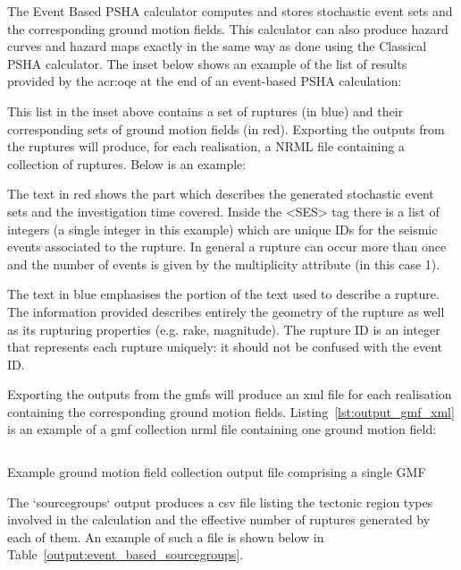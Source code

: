 The Event Based PSHA calculator computes and stores stochastic event sets and
the corresponding ground motion fields. This calculator can also produce
hazard curves and hazard maps exactly in the same way as done using the
Classical PSHA calculator. The inset below shows an example of the list of
results provided by the \gls{acr:oqe} at the end of an event-based PSHA
calculation:



This list in the inset above contains a set of ruptures (in blue) and their
corresponding sets of ground motion fields (in red). Exporting the outputs
from the ruptures will produce, for each realisation, a NRML file containing a
collection of ruptures. Below is an example:



The text in red shows the part which describes the generated
stochastic event sets and the investigation time covered. Inside the
<SES> tag there is a list of integers (a single integer in this example)
which are unique IDs for the seismic events associated to the rupture.
In general a rupture can occur more than once and the number of events
is given by the multiplicity attribute (in this case 1).

The text in blue emphasises the portion of the text used to describe a
rupture. The information provided describes entirely the geometry of the
rupture as well as its rupturing properties (e.g. rake, magnitude). The
rupture ID is an integer that represents each rupture uniquely: it should
not be confused with the event ID.

Exporting the outputs from the gmfs will produce an xml file for each
realisation containing the corresponding ground motion fields.
Listing~\ref{lst:output_gmf_xml} is an example of a gmf collection
nrml file containing one ground motion field:

\begin{listing}[htbp]
  \inputminted[firstline=1,firstnumber=1,fontsize=\footnotesize,frame=single,linenos,bgcolor=lightgray]{xml}{oqum/hazard/verbatim/output_gmf.xml}
  \caption{Example ground motion field collection output file comprising a single GMF}
  \label{lst:output_gmf_xml}
\end{listing}

The `sourcegroups` output produces a csv file listing the tectonic region
types involved in the calculation and the effective number of ruptures
generated by each of them. An example of such a file is shown below in
Table~\ref{output:event_based_sourcegroups}.


